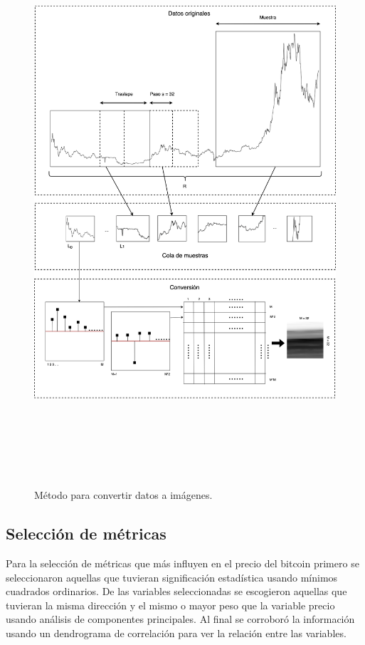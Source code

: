 \begin{figure}[h!]
	\includegraphics[width=\textwidth,height=21cm]{Chapter3/3-2.png}
	\caption{Método para convertir datos a imágenes.}
	\label{fig5}
\end{figure}

\subsection{Selección de métricas}
\label{ssec:metrics}
Para la selección de métricas que más influyen en el precio del bitcoin primero se seleccionaron aquellas que tuvieran significación estadística usando mínimos cuadrados ordinarios. De las variables seleccionadas se escogieron aquellas que tuvieran la misma dirección y el mismo o mayor peso que la variable precio usando análisis de componentes principales. Al final se corroboró la información usando un dendrograma de correlación para ver la relación entre las variables.


